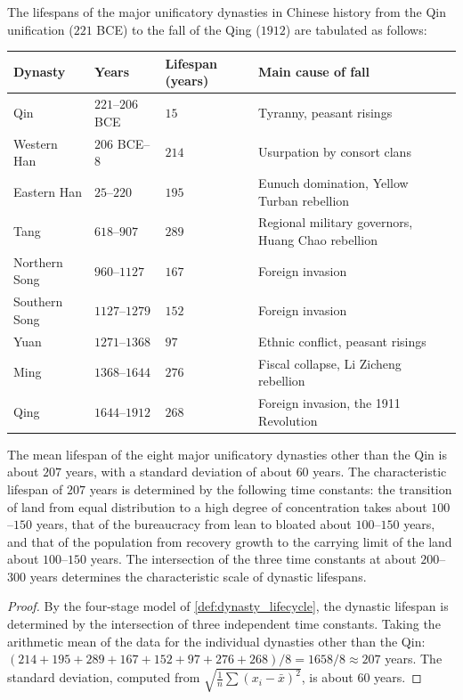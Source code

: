 \begin{proposition}\label{prop:dynasty_lifespan}
The lifespans of the major unificatory dynasties in Chinese history from the Qin unification ($221$ BCE) to the fall of the Qing ($1912$) are tabulated as follows:
\begin{center}
\begin{tabular}{>{\centering\arraybackslash}p{3cm}>{\centering\arraybackslash}p{2.5cm}>{\centering\arraybackslash}p{2.5cm}>{\centering\arraybackslash}p{3cm}}
\toprule
Dynasty & Years & Lifespan (years) & Main cause of fall \\
\midrule
Qin & $221$--$206$ BCE & $15$ & Tyranny, peasant risings \\
Western Han & $206$ BCE--$8$ & $214$ & Usurpation by consort clans \\
Eastern Han & $25$--$220$ & $195$ & Eunuch domination, Yellow Turban rebellion \\
Tang & $618$--$907$ & $289$ & Regional military governors, Huang Chao rebellion \\
Northern Song & $960$--$1127$ & $167$ & Foreign invasion \\
Southern Song & $1127$--$1279$ & $152$ & Foreign invasion \\
Yuan & $1271$--$1368$ & $97$ & Ethnic conflict, peasant risings \\
Ming & $1368$--$1644$ & $276$ & Fiscal collapse, Li Zicheng rebellion \\
Qing & $1644$--$1912$ & $268$ & Foreign invasion, the 1911 Revolution \\
\bottomrule
\end{tabular}
\end{center}
The mean lifespan of the eight major unificatory dynasties other than the Qin is about $207$ years, with a standard deviation of about $60$ years. The characteristic lifespan of $207$ years is determined by the following time constants: the transition of land from equal distribution to a high degree of concentration takes about $100$--$150$ years, that of the bureaucracy from lean to bloated about $100$--$150$ years, and that of the population from recovery growth to the carrying limit of the land about $100$--$150$ years. The intersection of the three time constants at about $200$--$300$ years determines the characteristic scale of dynastic lifespans.
\end{proposition}

\begin{proof}
By the four-stage model of \cref{def:dynasty_lifecycle}, the dynastic lifespan is determined by the intersection of three independent time constants. Taking the arithmetic mean of the data for the individual dynasties other than the Qin: $(214+195+289+167+152+97+276+268)/8=1658/8\approx207$ years. The standard deviation, computed from $\sqrt{\frac{1}{n}\sum(x_i-\bar x)^2}$, is about $60$ years.
\end{proof}

